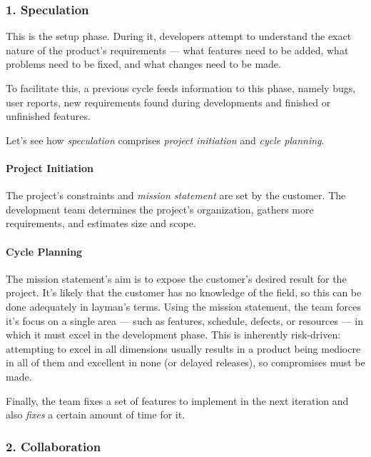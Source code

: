 \documentclass[main.tex]{subfiles}
\begin{document}
\subsubsection[Speculation]{1. Speculation}

This is the setup phase. During it, developers attempt to understand the exact nature of the product's requirements --- what features need to be added, what problems need to be fixed, and what changes need to be made.

To facilitate this, a previous cycle feeds information to this phase, namely bugs, user reports, new requirements found during developments and finished or unfinished features.

Let's see how \emph{speculation} comprises \emph{project initiation} and \emph{cycle planning}.

\paragraph{Project Initiation} The project's constraints and \textit{mission statement} are set by the customer. The development team determines the project's organization, gathers more requirements, and estimates size and scope.


\paragraph{Cycle Planning} The mission statement's aim is to expose the customer's desired result for the project.
It's likely that the customer has no knowledge of the field, so this can be done adequately in layman's terms. Using the mission statement, the team forces it's focus on a single area --- such as features, schedule, defects, or resources --- in which it must excel in the development phase. This is inherently risk-driven: attempting to excel in all dimensions usually results in a product being mediocre in all of them and excellent in none (or delayed releases), so compromises must be made.

Finally, the team fixes a set of features to implement in the next iteration and also \emph{fixes} a certain amount of time for it.

\subsubsection[Collaboration]{2. Collaboration}
\end{document}
